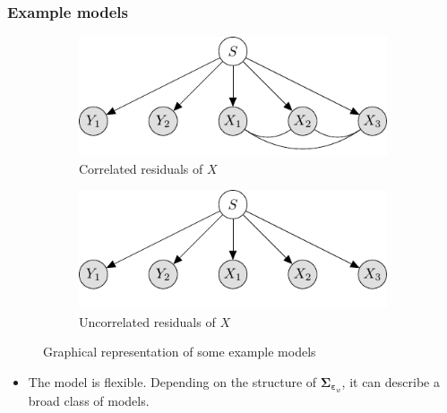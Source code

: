 \documentclass{beamer}
\newcommand{\mbf}[1]{\bm{#1}}
\newcommand{\beps}{\mbf{\varepsilon}}
\newcommand{\bsigma}{\mbf{\Sigma}}
\begin{document}
	\begin{frame}[t]\frametitle{Example models}
		\begin{figure}
	    \begin{subfigure}{0.45\textwidth}
	      \includegraphics[width=\textwidth]{Fig/model_1.pdf}
	      \caption{Correlated residuals of $X$}
	    \end{subfigure}\hfill
	    \begin{subfigure}{0.45\textwidth}
	      \includegraphics[width=\textwidth]{Fig/model_2.pdf}
	      \caption{Uncorrelated residuals of $X$}
	    \end{subfigure}
	    \caption{Graphical representation of some example models}
	    \label{fig:PGM_example}
  	\end{figure}
  \begin{itemize}
  	\item The model is flexible. Depending on the structure of $\bsigma_
  	{\beps_w}$, it can describe a broad class of models.
  \end{itemize}
	\end{frame}
\end{document}
